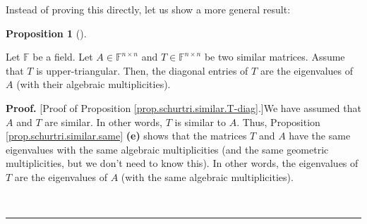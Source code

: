 \documentclass[numbers=enddot,12pt,final,onecolumn,notitlepage]{scrartcl}%
\numberwithin{exer}{subsection}
\theoremstyle{definition}
\newtheorem{prop}[theo]{Proposition}
\newenvironment{proposition}[1][]
{\begin{prop}[#1]\begin{leftbar}}
{\end{leftbar}\end{prop}}
\newenvironment{proof}[1][Proof]{\noindent\textbf{#1.} }{\ \rule{0.5em}{0.5em}}
\begin{document}
Instead of proving this directly, let us show a more general result:

\begin{proposition}
\label{prop.schurtri.similar.T-diag}Let $\mathbb{F}$ be a field. Let
$A\in\mathbb{F}^{n\times n}$ and $T\in\mathbb{F}^{n\times n}$ be two similar
matrices. Assume that $T$ is upper-triangular. Then, the diagonal entries of
$T$ are the eigenvalues of $A$ (with their algebraic multiplicities).
\end{proposition}

\begin{proof}
[Proof of Proposition \ref{prop.schurtri.similar.T-diag}.]We have assumed that
$A$ and $T$ are similar. In other words, $T$ is similar to $A$. Thus,
Proposition \ref{prop.schurtri.similar.same} \textbf{(e)} shows that the
matrices $T$ and $A$ have the same eigenvalues with the same algebraic
multiplicities (and the same geometric multiplicities, but we don't need to
know this). In other words, the eigenvalues of $T$ are the eigenvalues of $A$
(with the same algebraic multiplicities).


\end{proof}
\end{document}
